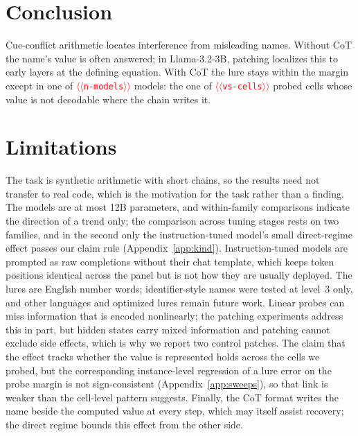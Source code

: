 \documentclass[11pt]{article}
\providecommand{\NUM}[1]{\textcolor{red}{$\langle\langle$\texttt{#1}$\rangle\rangle$}}
\begin{document}
\section{Conclusion}

Cue-conflict arithmetic locates interference from misleading names. Without CoT the name's
value is often answered; in Llama-3.2-3B, patching localizes this to early layers at the
defining equation. With CoT the lure stays within the margin except in one of
\NUM{n-models} models: the one of \NUM{vs-cells} probed cells whose value is not decodable
where the chain writes it.

\section*{Limitations}

The task is synthetic arithmetic with short chains, so the results need not transfer to real
code, which is the motivation for the task rather than a finding. The models are at most 12B
parameters, and within-family comparisons indicate the direction of a trend only; the comparison
across tuning stages rests on two families, and in the second only the instruction-tuned model's
small direct-regime effect passes our claim rule (Appendix~\ref{app:kind}). Instruction-tuned models are prompted as raw
completions without their chat template, which keeps token positions identical across the panel
but is not how they are usually deployed. The lures are
English number words; identifier-style names were tested at level~3 only, and other languages
and optimized lures remain future work. Linear probes can miss information that is encoded nonlinearly; the
patching experiments address this in part, but hidden states carry mixed information and
patching cannot exclude side effects, which is why we report two control patches. The claim
that the effect tracks whether the value is represented holds across the cells we probed, but
the corresponding instance-level regression of a lure error on the probe margin is not
sign-consistent (Appendix~\ref{app:sweeps}), so that link is weaker than the cell-level
pattern suggests. Finally, the
CoT format writes the name beside the computed value at every step, which may itself assist
recovery; the direct regime bounds this effect from the other side.



\appendix
\end{document}

